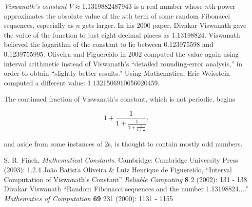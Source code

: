 \documentclass[12pt]{article}
\begin{document}
{\em Viswanath's constant} $V \approx 1.1319882487943$ is a real number whose $n$th power approximates the absolute value of the $n$th term of some random Fibonacci sequences, especially as $n$ gets larger. In his 2000 paper, Divakar  Viswanath gave the value of the function to just eight decimal places as 1.13198824. Viswanath believed the logarithm of the constant to lie between 0.123975598 and 0.1239755995. Oliveira and Figuereido in 2002 computed the value again using interval arithmetic instead of Viswanath's ``detailed rounding-error analysis,'' in order to obtain ``slightly better results.'' Using Mathematica, Eric Weisstein computed a different value: 1.1321506910656020459.

The continued fraction of Viswanath's constant, which is not periodic, begins

$$1 + \frac{1}{1 + \frac{1}{7 + \frac{1}{1 + \frac{1}{\ddots}}}},$$

and aside from some instances of 2s, is thought to contain mostly odd numbers.

\begin{thebibliography}{1}
 S. R. Finch, {\it Mathematical Constants}. Cambridge: Cambridge University Press (2003): 1.2.4
 Jo\~ao Batista Oliveira \& Luiz Henrique de Figuereido, ``Interval Computation of Viswanath's Constant'' {\it Reliable Computing} {\bf 8} 2 (2002): 131 - 138
 Divakar Viswanath ``Random Fibonacci sequences and the number 1.13198824....'' {\it Mathematics of Computation} {\bf 69} 231 (2000): 1131 - 1155
\end{thebibliography}
\end{document}
